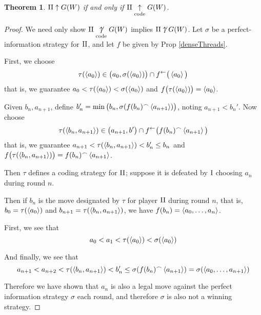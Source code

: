 \documentclass{amsart}
\theoremstyle{plain}
\newtheorem{theorem}{Theorem}
\theoremstyle{definition}
\theoremstyle{remark}
\theoremstyle{plain}
\theoremstyle{definition}
\theoremstyle{remark}
\begin{document}
\begin{theorem}
\(\mathrm{II}\uparrow G(W)\) if and only if \(\mathrm{II}\underset{\text{code}}{\uparrow} G(W)\).
\end{theorem}
\begin{proof}
We need only show 
\(\mathrm{II}\underset{\text{code}}{\not\uparrow} G(W)\) implies \(\mathrm{II}\not\uparrow G(W)\).
Let \(\sigma\) be a perfect-information strategy for \(\mathrm{II}\),
and let \(f\) be given by Prop \ref{denseThreads}.

First, we choose
\[
\tau(\left\langle a_0\right\rangle)\in
\big(a_0,\sigma(\left\langle a_0\right\rangle)\big)\cap
f^\leftarrow\big(\left\langle a_0\right\rangle\big)
\]
that is, we guarantee \(a_0<\tau(\left\langle a_0\right\rangle)<\sigma(\left\langle a_0\right\rangle)\)
and \(f\big(\tau(\left\langle a_0\right\rangle)\big)=\left\langle a_0\right\rangle\).

Given \(b_n,a_{n+1}\), define
\(b_n'=\min\big(b_n,\sigma(f(b_n){^\frown}\left\langle a_{n+1}\right\rangle)\big)\),
noting \(a_{n+1}<b_n'\). Now choose
\[
\tau(\left\langle b_n,a_{n+1}\right\rangle)\in
\big(a_{n+1},b'\big)\cap
f^\leftarrow\big(f(b_n){^\frown}\left\langle a_{n+1}\right\rangle\big)
\]
that is, we guarantee
\(a_{n+1}<\tau(\left\langle b_n,a_{n+1}\right\rangle)<b_n'\leq b_n\) and
\(f\big(\tau(\left\langle b_n,a_{n+1}\right\rangle)\big)=f(b_n){^\frown}\left\langle a_{n+1}\right\rangle\).

Then \(\tau\) defines a coding strategy for \(\mathrm{II}\); suppose it is
defeated by \(\mathrm{I}\) choosing \(a_n\) during round \(n\).

Then if \(b_n\) is the move designated by \(\tau\) for player \(\mathrm{II}\)
during round \(n\), that is, \(b_0=\tau(\left\langle a_0\right\rangle)\) and
\(b_{n+1}=\tau(\left\langle b_n,a_{n+1}\right\rangle)\),
we have \(f(b_n)=\left\langle a_0,\dots,a_n\right\rangle\).

First, we see that
\[a_0<a_1<\tau(\left\langle a_0\right\rangle)<\sigma(\left\langle a_0\right\rangle)\]

And finally, we see that
\[a_{n+1}<a_{n+2}<\tau(\left\langle b_n,a_{n+1}\right\rangle)<b_n'\leq
\sigma(f(b_n){^\frown}\left\langle a_{n+1}\right\rangle)=\sigma(\left\langle a_0,\dots,a_{n+1}\right\rangle)\]

Therefore we have shown that \(a_n\) is also a legal move against the
perfect information strategy \(\sigma\) each round, and therefore
\(\sigma\) is also not a winning strategy.
\end{proof}
\end{document}
